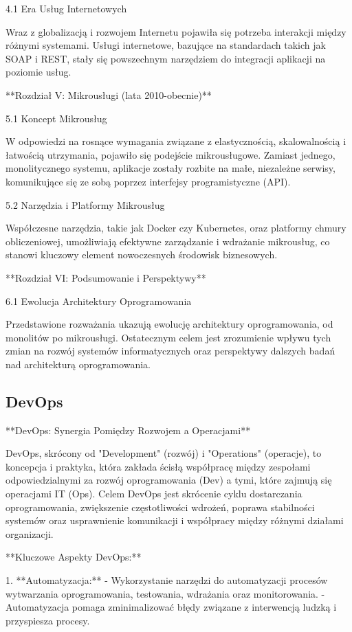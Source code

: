 4.1 Era Usług Internetowych

Wraz z globalizacją i rozwojem Internetu pojawiła się potrzeba interakcji między różnymi systemami. Usługi internetowe, bazujące na standardach takich jak SOAP i REST, stały się powszechnym narzędziem do integracji aplikacji na poziomie usług.

**Rozdział V: Mikrousługi (lata 2010-obecnie)**

5.1 Koncept Mikrousług

W odpowiedzi na rosnące wymagania związane z elastycznością, skalowalnością i łatwością utrzymania, pojawiło się podejście mikrousługowe. Zamiast jednego, monolitycznego systemu, aplikacje zostały rozbite na małe, niezależne serwisy, komunikujące się ze sobą poprzez interfejsy programistyczne (API).

5.2 Narzędzia i Platformy Mikrousług

Współczesne narzędzia, takie jak Docker czy Kubernetes, oraz platformy chmury obliczeniowej, umożliwiają efektywne zarządzanie i wdrażanie mikrousług, co stanowi kluczowy element nowoczesnych środowisk biznesowych.

**Rozdział VI: Podsumowanie i Perspektywy**

6.1 Ewolucja Architektury Oprogramowania

Przedstawione rozważania ukazują ewolucję architektury oprogramowania, od monolitów po mikrousługi. Ostatecznym celem jest zrozumienie wpływu tych zmian na rozwój systemów informatycznych oraz perspektywy dalszych badań nad architekturą oprogramowania.
\subsection{DevOps}
**DevOps: Synergia Pomiędzy Rozwojem a Operacjami**

DevOps, skrócony od "Development" (rozwój) i "Operations" (operacje), to koncepcja i praktyka, która zakłada ścisłą współpracę między zespołami odpowiedzialnymi za rozwój oprogramowania (Dev) a tymi, które zajmują się operacjami IT (Ops). Celem DevOps jest skrócenie cyklu dostarczania oprogramowania, zwiększenie częstotliwości wdrożeń, poprawa stabilności systemów oraz usprawnienie komunikacji i współpracy między różnymi działami organizacji.

**Kluczowe Aspekty DevOps:**

1. **Automatyzacja:**
   - Wykorzystanie narzędzi do automatyzacji procesów wytwarzania oprogramowania, testowania, wdrażania oraz monitorowania.
   - Automatyzacja pomaga zminimalizować błędy związane z interwencją ludzką i przyspiesza procesy.

